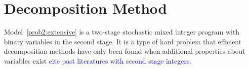 \documentclass[11pt]{article}
\begin{document}
	\section{Decomposition Method} \label{sec:decomposition}
	Model~\eqref{prob2:extensive} is a two-stage stochastic mixed integer program with binary variables in the second stage. It is a type of hard problem that efficient decomposition methods have only been found when additional properties about variables exist \textcolor{blue}{cite past literatures with second stage integers.}

\end{document}
